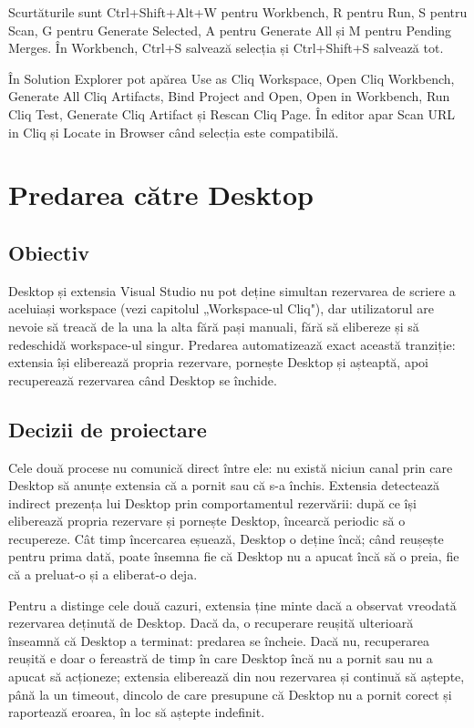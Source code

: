 \documentclass[12pt,a4paper]{report}
\begin{document}
Scurtăturile sunt Ctrl+Shift+Alt+W pentru Workbench, R pentru Run, S pentru Scan, G pentru Generate Selected, A pentru Generate All și M pentru Pending Merges. În Workbench, Ctrl+S salvează selecția și Ctrl+Shift+S salvează tot.

În Solution Explorer pot apărea Use as Cliq Workspace, Open Cliq Workbench, Generate All Cliq Artifacts, Bind Project and Open, Open in Workbench, Run Cliq Test, Generate Cliq Artifact și Rescan Cliq Page. În editor apar Scan URL in Cliq și Locate in Browser când selecția este compatibilă.

\chapter{Predarea către Desktop}

\section{Obiectiv}

Desktop și extensia Visual Studio nu pot deține simultan rezervarea de scriere a aceluiași workspace (vezi capitolul „Workspace-ul Cliq"), dar utilizatorul are nevoie să treacă de la una la alta fără pași manuali, fără să elibereze și să redeschidă workspace-ul singur. Predarea automatizează exact această tranziție: extensia își eliberează propria rezervare, pornește Desktop și așteaptă, apoi recuperează rezervarea când Desktop se închide.

\section{Decizii de proiectare}

Cele două procese nu comunică direct între ele: nu există niciun canal prin care Desktop să anunțe extensia că a pornit sau că s-a închis. Extensia detectează indirect prezența lui Desktop prin comportamentul rezervării: după ce își eliberează propria rezervare și pornește Desktop, încearcă periodic să o recupereze. Cât timp încercarea eșuează, Desktop o deține încă; când reușește pentru prima dată, poate însemna fie că Desktop nu a apucat încă să o preia, fie că a preluat-o și a eliberat-o deja.

Pentru a distinge cele două cazuri, extensia ține minte dacă a observat vreodată rezervarea deținută de Desktop. Dacă da, o recuperare reușită ulterioară înseamnă că Desktop a terminat: predarea se încheie. Dacă nu, recuperarea reușită e doar o fereastră de timp în care Desktop încă nu a pornit sau nu a apucat să acționeze; extensia eliberează din nou rezervarea și continuă să aștepte, până la un timeout, dincolo de care presupune că Desktop nu a pornit corect și raportează eroarea, în loc să aștepte indefinit.
\end{document}
